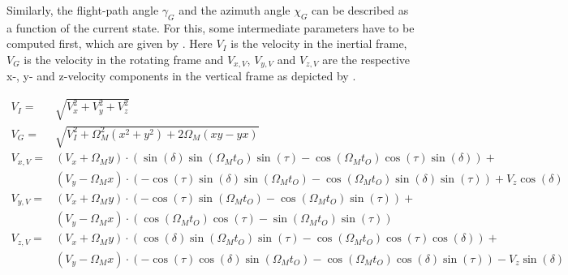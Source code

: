 \noindent
Similarly, the flight-path angle $\gamma_{G}$ and the azimuth angle $\chi_{G}$ can be described as a function of the current state. For this, some intermediate parameters have to be computed first, which are given by . Here $V_{I}$ is the velocity in the inertial frame, $V_{G}$ is the velocity in the rotating frame and $V_{x,V}$, $V_{y,V}$ and $V_{z,V}$ are the respective x-, y- and z-velocity components in the vertical frame as depicted by .

\begin{equation} \label{eq:intermediateParameters}
\begin{split}
V_{I}=&\sqrt{V_{x}^{2}+V_{y}^{2}+V_{z}^{2}}\\
V_{G}=&\sqrt{V_{I}^{2}+\Omega_{M}^{2}\left(x^{2}+y^{2}\right)+2\Omega_{M}\left(xy-yx\right)}\\
V_{x,V}=&\left(V_{x}+\Omega_{M}y\right)\cdot \left(\sin\left(\delta\right)\sin\left(\Omega_{M}t_{O}\right)\sin\left(\tau\right)-\cos\left(\Omega_{M}t_{O}\right)\cos\left(\tau\right)\sin\left(\delta	\right)\right)+\\
&\left(V_{y}-\Omega_{M}x\right)\cdot \left(-\cos\left(\tau\right)\sin\left(\delta\right)\sin\left(\Omega_{M}t_{O}\right)-\cos\left(\Omega_{M}t_{O}\right)\sin\left(\delta\right)\sin\left(\tau\right)\right)+V_{z}\cos\left(\delta\right)\\
V_{y,V}=&\left(V_{x}+\Omega_{M}y\right)\cdot \left(-\cos\left(\tau\right)\sin\left(\Omega_{M}t_{O}\right)-\cos\left(\Omega_{M}t_{O}\right)\sin\left(\tau\right)\right)+\\
&\left(V_{y}-\Omega_{M}x\right)\cdot \left(\cos\left(\Omega_{M}t_{O}\right)\cos\left(\tau\right)-\sin\left(\Omega_{M}t_{O}\right)\sin\left(\tau\right)\right)\\
V_{z,V}=&\left(V_{x}+\Omega_{M}y\right)\cdot \left(\cos\left(\delta\right)\sin\left(\Omega_{M}t_{O}\right)\sin\left(\tau\right)-\cos\left(\Omega_{M}t_{O}\right)\cos\left(\tau\right)\cos\left(\delta	\right)\right)+\\
&\left(V_{y}-\Omega_{M}x\right)\cdot \left(-\cos\left(\tau\right)\cos\left(\delta\right)\sin\left(\Omega_{M}t_{O}\right)-\cos\left(\Omega_{M}t_{O}\right)\cos\left(\delta\right)\sin\left(\tau\right)\right)-V_{z}\sin\left(\delta\right)\\
\end{split}
\end{equation}


